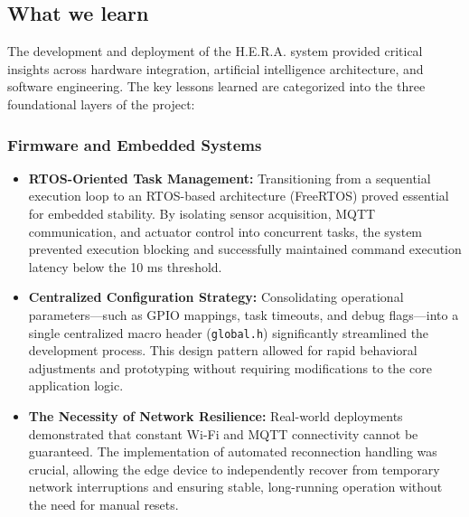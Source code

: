\subsection{What we learn}

The development and deployment of the H.E.R.A. system provided critical insights across hardware integration, artificial intelligence architecture, and software engineering. The key lessons learned are categorized into the three foundational layers of the project:

\subsubsection{Firmware and Embedded Systems}
\begin{itemize}
    \item \textbf{RTOS-Oriented Task Management:} Transitioning from a sequential execution loop to an RTOS-based architecture (FreeRTOS) proved essential for embedded stability. By isolating sensor acquisition, MQTT communication, and actuator control into concurrent tasks, the system prevented execution blocking and successfully maintained command execution latency below the 10 ms threshold.
    \item \textbf{Centralized Configuration Strategy:} Consolidating operational parameters---such as GPIO mappings, task timeouts, and debug flags---into a single centralized macro header (\texttt{global.h}) significantly streamlined the development process. This design pattern allowed for rapid behavioral adjustments and prototyping without requiring modifications to the core application logic.
    \item \textbf{The Necessity of Network Resilience:} Real-world deployments demonstrated that constant Wi-Fi and MQTT connectivity cannot be guaranteed. The implementation of automated reconnection handling was crucial, allowing the edge device to independently recover from temporary network interruptions and ensuring stable, long-running operation without the need for manual resets.
\end{itemize}

